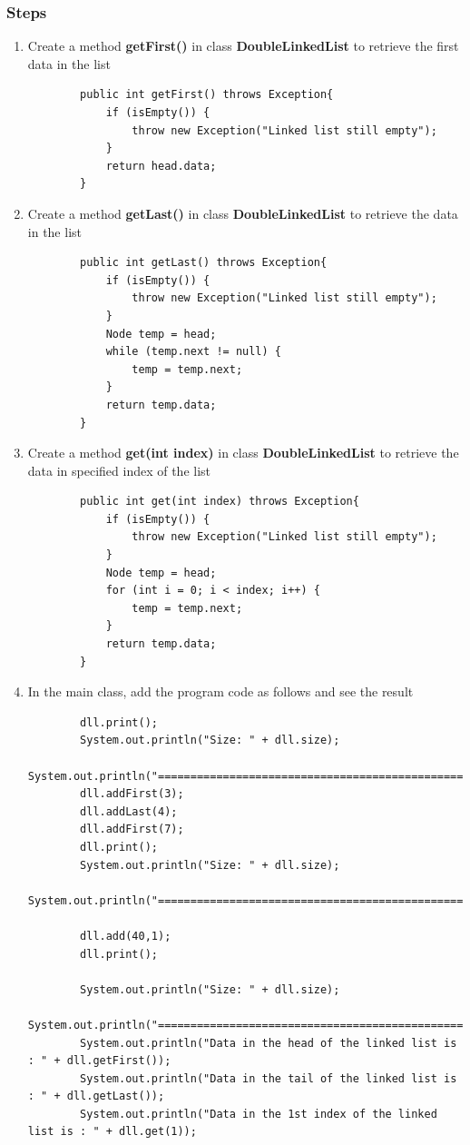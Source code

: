 \documentclass[12pt,titlepage]{article}
\begin{document}
\subsubsection{Steps}
\begin{enumerate}
    \item Create a method \textbf{getFirst()} in class \textbf{DoubleLinkedList} to retrieve the first data in the list
    \begin{verbatim}
        public int getFirst() throws Exception{
            if (isEmpty()) {
                throw new Exception("Linked list still empty");
            }
            return head.data;
        }
    \end{verbatim}
    \item Create a method \textbf{getLast()} in class \textbf{DoubleLinkedList} to retrieve the data in the list
    \begin{verbatim}
        public int getLast() throws Exception{
            if (isEmpty()) {
                throw new Exception("Linked list still empty");
            }
            Node temp = head;
            while (temp.next != null) {
                temp = temp.next;
            }
            return temp.data;
        }
    \end{verbatim}
    \item Create a method \textbf{get(int index)} in class \textbf{DoubleLinkedList} to retrieve the data in specified index of the list
    \begin{verbatim}
        public int get(int index) throws Exception{
            if (isEmpty()) {
                throw new Exception("Linked list still empty");
            }
            Node temp = head;
            for (int i = 0; i < index; i++) {
                temp = temp.next;
            }
            return temp.data;
        }
    \end{verbatim}
    \item In the main class, add the program code as follows and see the result
    \begin{verbatim}
        dll.print();
        System.out.println("Size: " + dll.size);
        System.out.println("================================================");
        dll.addFirst(3);
        dll.addLast(4);
        dll.addFirst(7);
        dll.print();
        System.out.println("Size: " + dll.size);
        System.out.println("================================================");

        dll.add(40,1);
        dll.print();

        System.out.println("Size: " + dll.size);
        System.out.println("================================================");
        System.out.println("Data in the head of the linked list is : " + dll.getFirst());
        System.out.println("Data in the tail of the linked list is : " + dll.getLast());
        System.out.println("Data in the 1st index of the linked list is : " + dll.get(1));
    \end{verbatim}
\end{enumerate}
\end{document}
